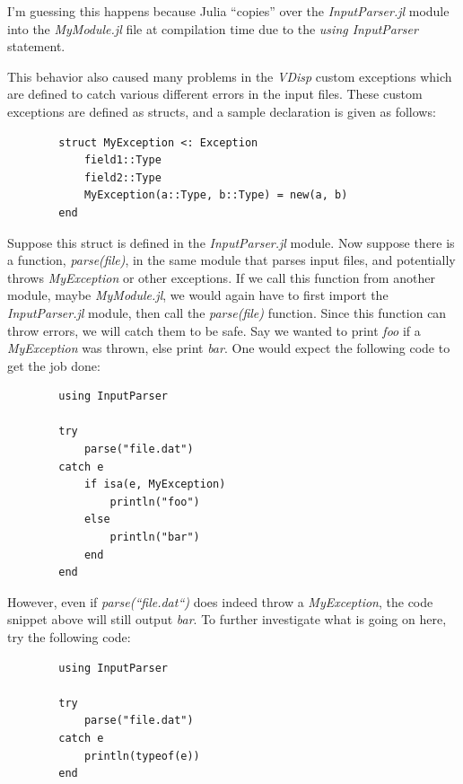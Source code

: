 \documentclass[11pt,fleqn]{article}
\newcommand{\indentpar}{\phantom{=}}
\begin{document}
        \indentpar I'm guessing this happens because Julia “copies” over the \emph{InputParser.jl}
        module into the \emph{MyModule.jl} file at compilation time due to the \emph{using InputParser}
        statement.

        \indentpar This behavior also caused many problems in the \emph{VDisp} custom exceptions which 
        are defined to catch various different errors in the input files. These custom exceptions are
        defined as structs, and a sample declaration is given as follows:
        
        \begin{verbatim}
        struct MyException <: Exception
            field1::Type
            field2::Type
            MyException(a::Type, b::Type) = new(a, b) 
        end
        \end{verbatim}

        Suppose this struct is defined in the \emph{InputParser.jl} module. Now suppose there is a function, \emph{parse(file)}, 
        in the same module that parses input files, and potentially throws \emph{MyException} or other exceptions.
        If we call this function from another module, maybe \emph{MyModule.jl}, we would again have to first import 
        the \emph{InputParser.jl} module, then call the \emph{parse(file)} function. Since this function can throw errors,
        we will catch them to be safe. Say we wanted to print \emph{foo} if a \emph{MyException} was thrown, else print \emph{bar}.
        One would expect the following code to get the job done:

        \begin{verbatim}
        using InputParser
        
        try
            parse("file.dat")
        catch e
            if isa(e, MyException)
                println("foo")
            else
                println("bar")
            end
        end
        \end{verbatim}

        \indentpar However, even if \emph{parse(“file.dat“)} does indeed throw a \emph{MyException},
        the code snippet above will still output \emph{bar}. To further investigate what is going on 
        here, try the following code:

        \begin{verbatim}
        using InputParser
        
        try
            parse("file.dat")
        catch e
            println(typeof(e))
        end
        \end{verbatim}
\end{document}

